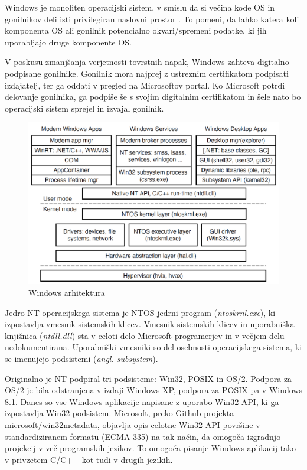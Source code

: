 \documentclass[a4paper,12pt,openright]{book}
\begin{document}
Windows je monoliten operacijski sistem, v smislu da si večina kode OS in gonilnikov deli isti privilegiran naslovni prostor \cite{Yosifovich_Russinovich_Solomon_Ionescu_2017}.
To pomeni, da lahko katera koli komponenta OS ali gonilnik potencialno okvari/spremeni podatke, ki jih uporabljajo druge komponente OS.

V poskusu zmanjšanja verjetnosti tovrstnih napak, Windows zahteva digitalno podpisane gonilnike.
Gonilnik mora najprej z ustreznim certifikatom podpisati izdajatelj, ter ga oddati v pregled na Microsoftov portal.
Ko Microsoft potrdi delovanje gonilnika, ga podpiše še s svojim digitalnim certifikatom in šele nato bo operacijski sistem sprejel in izvajal gonilnik.

\begin{figure}[h!]
	\begin{center}
		\includegraphics[width=\textwidth]{images/windows_programming_layers.png}
	\end{center}
	\caption{Windows arhitektura \cite{Tanenbaum_Bos_2023}}
	\label{fig:windows_architecture}
\end{figure}

Jedro NT operacijskega sistema je NTOS jedrni program (\textit{ntoskrnl.exe}), ki izpostavlja vmesnik sistemskih klicev.
Vmesnik sistemskih klicev in uporabniška knjižnica (\textit{ntdll.dll}) sta v celoti delo Microsoft programerjev in v večjem delu nedokumentirana.
Uporabniški vmesniki so del osebnosti operacijskega sistema, ki se imenujejo podsistemi (\textit{angl. subsystem}).

Originalno je NT podpiral tri podsisteme: Win32, POSIX in OS/2.
Podpora za OS/2 je bila odstranjena v izdaji Windows XP, podpora za POSIX pa v Windows 8.1.
Danes so vse Windows aplikacije napisane z uporabo Win32 API, ki ga izpostavlja Win32 podsistem.
Microsoft, preko Github projekta \href{https://github.com/microsoft/win32metadata}{microsoft/win32metadata}, objavlja opis celotne Win32 API površine v standardiziranem formatu (ECMA-335) na tak način, da omogoča izgradnjo projekcij v več programskih jezikov.
To omogoča pisanje Windows aplikacij tako v privzetem C/C++ kot tudi v drugih jezikih.
\end{document}
